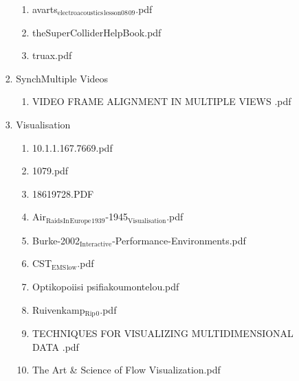 \documentclass[11pt]{article}
\begin{document}
\begin{enumerate}
\begin{enumerate}
\begin{enumerate}
\begin{enumerate}
\begin{enumerate}
\item avarts$_{\text{electroacoustics}}$$_{\text{lesson08}}$$_{\text{09}}$.pdf
\label{sec-1-1-1-1-7-3-45-13}

\item theSuperColliderHelpBook.pdf
\label{sec-1-1-1-1-7-3-45-14}

\item truax.pdf
\label{sec-1-1-1-1-7-3-45-15}
\end{enumerate}

\item SynchMultiple Videos
\label{sec-1-1-1-1-7-3-46}
\begin{enumerate}
\item VIDEO FRAME ALIGNMENT IN MULTIPLE VIEWS .pdf
\label{sec-1-1-1-1-7-3-46-1}
\end{enumerate}

\item Visualisation
\label{sec-1-1-1-1-7-3-47}
\begin{enumerate}
\item 10.1.1.167.7669.pdf
\label{sec-1-1-1-1-7-3-47-1}

\item 1079.pdf
\label{sec-1-1-1-1-7-3-47-2}

\item 18619728.PDF
\label{sec-1-1-1-1-7-3-47-3}

\item Air$_{\text{Raids}}$$_{\text{In}}$$_{\text{Europe}}$$_{\text{1939}}$-1945$_{\text{Visualisation}}$.pdf
\label{sec-1-1-1-1-7-3-47-4}

\item Burke-2002$_{\text{Interactive}}$-Performance-Environments.pdf
\label{sec-1-1-1-1-7-3-47-5}

\item CST$_{\text{EMS}}$$_{\text{low}}$.pdf
\label{sec-1-1-1-1-7-3-47-6}

\item Optikopoiisi psifiakoumontelou.pdf
\label{sec-1-1-1-1-7-3-47-7}

\item Ruivenkamp$_{\text{Rip}}$$_{\text{0}}$.pdf
\label{sec-1-1-1-1-7-3-47-8}

\item TECHNIQUES FOR VISUALIZING MULTIDIMENSIONAL DATA .pdf
\label{sec-1-1-1-1-7-3-47-9}

\item The Art \& Science of Flow Visualization.pdf
\label{sec-1-1-1-1-7-3-47-10}


\end{enumerate}
\end{enumerate}
\end{enumerate}
\end{enumerate}
\end{enumerate}
\end{document}
